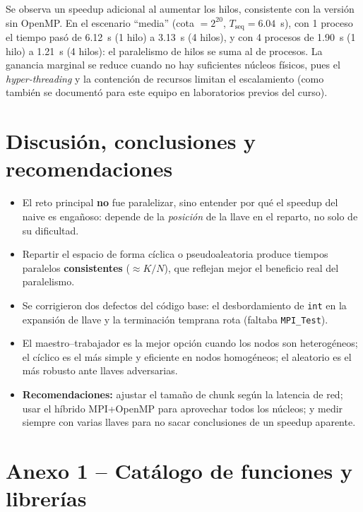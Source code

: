 \documentclass[11pt]{article}
\begin{document}
Se observa un speedup adicional al aumentar los hilos, consistente con la versión sin OpenMP. En el
escenario ``media'' (cota $=2^{20}$, $T_\text{seq}=6.04$~s), con 1 proceso el tiempo pasó de 6.12~s
(1 hilo) a 3.13~s (4 hilos), y con 4 procesos de 1.90~s (1 hilo) a 1.21~s (4 hilos): el paralelismo de
hilos se suma al de procesos. La ganancia marginal se reduce cuando no hay suficientes núcleos físicos,
pues el \emph{hyper-threading} y la contención de recursos limitan el escalamiento (como también se
documentó para este equipo en laboratorios previos del curso).

\section{Discusión, conclusiones y recomendaciones}
\begin{itemize}
  \item El reto principal \textbf{no} fue paralelizar, sino entender por qué el speedup del naive es
    engañoso: depende de la \emph{posición} de la llave en el reparto, no solo de su dificultad.
  \item Repartir el espacio de forma cíclica o pseudoaleatoria produce tiempos paralelos
    \textbf{consistentes} ($\approx K/N$), que reflejan mejor el beneficio real del paralelismo.
  \item Se corrigieron dos defectos del código base: el desbordamiento de \texttt{int} en la expansión
    de llave y la terminación temprana rota (faltaba \texttt{MPI\_Test}).
  \item El maestro--trabajador es la mejor opción cuando los nodos son heterogéneos; el cíclico es el
    más simple y eficiente en nodos homogéneos; el aleatorio es el más robusto ante llaves adversarias.
  \item \textbf{Recomendaciones:} ajustar el tamaño de chunk según la latencia de red; usar el híbrido
    MPI+OpenMP para aprovechar todos los núcleos; y medir siempre con varias llaves para no sacar
    conclusiones de un speedup aparente.
\end{itemize}

\newpage
\appendix
\section{Anexo 1 -- Catálogo de funciones y librerías}
\end{document}
